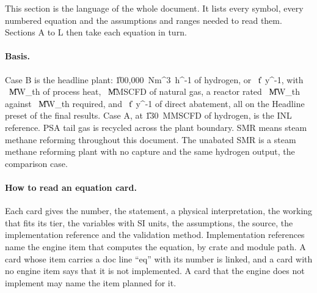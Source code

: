 This section is the language of the whole document. It lists every symbol, every numbered equation and the assumptions and ranges needed to read them. Sections A to L then take each equation in turn.

\paragraph{Basis.} Case B is the headline plant: \U{100{,}000\ Nm^3\ h^{-1}} of hydrogen, or \vMHtwoB~\U{t\ y^{-1}}, with \vQprocB~\U{MW_{th}} of process heat, \vNGB~\U{MMSCFD} of natural gas, a reactor rated \cQrated~\U{MW_{th}} against \vQRB~\U{MW_{th}} required, and \vAbateB~\U{t\ y^{-1}} of direct abatement, all on the Headline preset of the final results. Case A, at \U{130\ MMSCFD} of hydrogen, is the INL reference. PSA tail gas is recycled across the plant boundary. SMR means steam methane reforming throughout this document. The unabated SMR is a steam methane reforming plant with no capture and the same hydrogen output, the comparison case.

\paragraph{How to read an equation card.} Each card gives the number, the statement, a physical interpretation, the working that fits its tier, the variables with SI units, the assumptions, the source, the implementation reference and the validation method. Implementation references name the engine item that computes the equation, by crate and module path. A card whose item carries a doc line ``eq'' with its number is linked, and a card with no engine item says that it is not implemented. A card that the engine does not implement may name the item planned for it.

